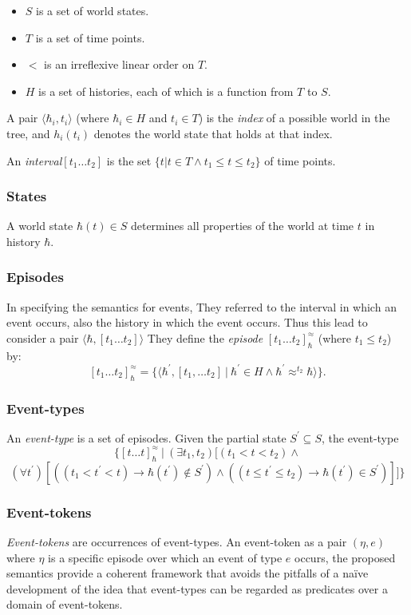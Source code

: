 \begin{itemize}
	\item $S$ is a set of world states.
	\item $T$ is a set of time points.
	\item $<$ is an irreflexive linear order on $T$.
	\item $H$ is a set of histories, each of which is a function from $T$ to $S$.
\end{itemize}

A pair $\langle \hbar_i, t_i \rangle$ (where $\hbar_i \in H$ and $t_i \in T$) is the \textit{index} of a possible world in the tree, and $h_i(t_i)$ denotes the world state that holds at that index.

An \textit{interval}$[t_1 \dots t_2]$ is the set $\{ t | t \in T \land t_1 \leq t \leq t_2\}$ of time points.


\subsubsection{States}
A world state $\hbar(t) \in S$ determines all properties of the world at time $t$ in history $\hbar$.

\subsubsection{Episodes}
In specifying the semantics for events, They referred to the interval in which an event occurs, also the history in which the event occurs.
Thus this lead to consider a pair $\langle \hbar, [t_1 \dots t_2] \rangle$
They define the \textit{episode} $[t_1 \dots t_2]_{\hbar}^{\approx}$ (where $t_1 \leq t_2$) by:
\[
	[t_1 \dots t_2]_{\hbar}^{\approx} = \{\langle \hbar^{\prime}, [t_1, \dots t_2] \ | \  \hbar^{\prime} \in H \land \hbar^{\prime} \approx^{t_2} \hbar \rangle\}.
\]

\subsubsection{Event-types}
An \textit{event-type} is a set of episodes. Given the partial state $S^{\prime} \subseteq S$, the event-type
\[
	\{
	[t \dots t]_{\hbar}^{\approx} \ | \ (\exists t_1, t_2) [
			(t_1 < t < t_2) \land
			\]
			\[
			(\forall t^{\prime})[
					((t_1 < t^{\prime} < t) \to \hbar(t^{\prime}) \not\in S^{\prime}) \land
					((t \leq t^{\prime} \leq t_2) \to \hbar(t^{\prime}) \in S^{\prime})
				]
		]
	\}
\]

\subsubsection{Event-tokens}
\textit{Event-tokens} are occurrences of event-types.
An event-token as a pair $(\eta, e)$ where $\eta$ is a specific episode over which an event of type $e$ occurs, the proposed semantics provide a coherent framework that avoids the pitfalls of a naïve development of the idea that event-types can be regarded as predicates over a domain of event-tokens.

